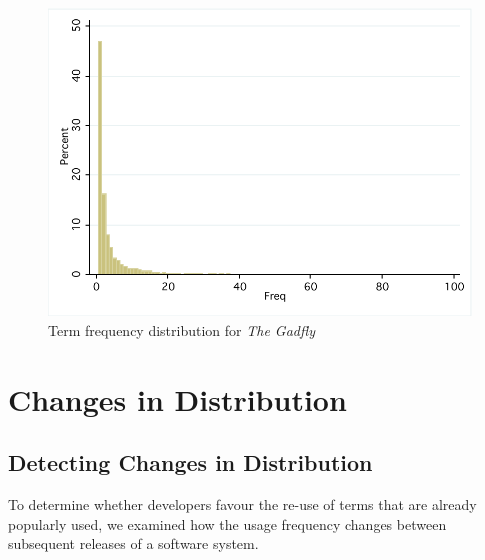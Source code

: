 \begin{figure}[t]
\centering
\includegraphics[width=\textwidth]{Figures/Vocab-GadflyFreqDist.pdf}
\caption{Term frequency distribution for \emph{The Gadfly}}
\label{fig:vocab-freqdist-gadfly}
\end{figure}




\section{Changes in Distribution} %
\label{sec:changes_in_distribution}

\subsection{Detecting Changes in Distribution} %
\label{sub:detecting_changes_in_distribution}


To determine whether developers favour the re-use of terms that are already popularly used, we examined how the usage frequency changes between subsequent releases of a software system.


